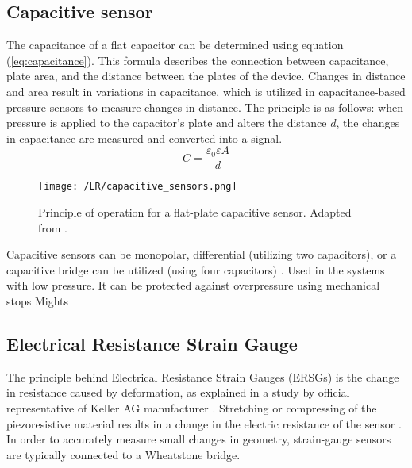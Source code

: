 \subsection{Capacitive sensor}
The capacitance of a flat capacitor can be determined using equation (\ref*{eq:capacitance}). 
This formula describes the connection between capacitance, plate area, and the distance between the plates of the device. 
Changes in distance and area result in variations in capacitance, which is utilized in capacitance-based pressure sensors to measure changes in distance.
The principle is as follows: when pressure is applied to the capacitor's plate and alters the distance $d$, the changes in capacitance are measured and converted into a signal.
\begin{equation}
    \label{eq:capacitance}
    C = \frac{\varepsilon_0 \varepsilon A}{d}
\end{equation}
\begin{figure}[t]
    \centering
    \texttt{[image: /LR/capacitive\_sensors.png]}
    \caption{Principle of operation for a flat-plate capacitive sensor. Adapted from \cite[Fig. 7.6]{handbook_sensors}.}
    \label{fig:capacitive_sensors}
\end{figure}



Capacitive sensors can be monopolar, differential (utilizing two capacitors), or a capacitive bridge can be utilized (using four capacitors) \cite{handbook_sensors}.
Used in the systems with low pressure. It can be protected against overpressure using mechanical stops
Mights 



\subsection{Electrical Resistance Strain Gauge}
The principle behind Electrical Resistance Strain Gauges (ERSGs) is the change in resistance caused 
by deformation, as explained in a study by official representative of Keller AG manufacturer \cite{keller_article}. 
Stretching or compressing of the piezoresistive material results in a change in the electric resistance of the sensor 
\cite{multi_axis_force_sensors_review}. 
In order to accurately measure small changes in geometry, 
strain-gauge sensors are typically connected to a Wheatstone bridge.

